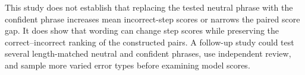 This study does not establish that replacing the tested neutral phrase with the confident phrase increases mean incorrect-step scores or narrows the paired score gap. It does show that wording can change step scores while preserving the correct–incorrect ranking of the constructed pairs. A follow-up study could test several length-matched neutral and confident phrases, use independent review, and sample more varied error types before examining model scores.
